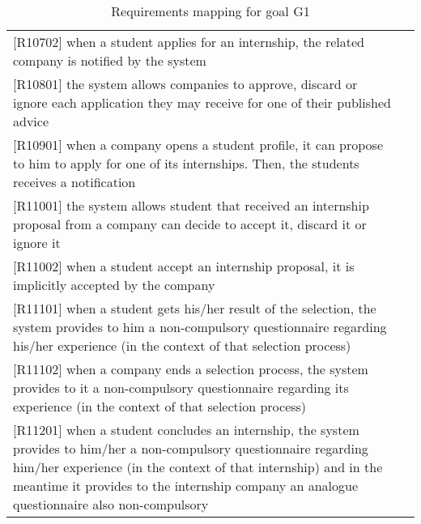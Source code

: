 \begin{table} [h!]
\begin{tabular}{ || P{7.5cm} P{7.5cm} || }
					[R10702] when a student applies for an internship, the related company is notified by the system & \\
					
					[R10801] the system allows companies to approve, discard or ignore each application they may receive for one of their published advice & \\
					
					[R10901] when a company opens a student profile, it can propose to him to apply for one of its internships. Then, the students receives a notification & \\
					
					[R11001] the system allows student that received an internship proposal from a company can decide to accept it, discard it or ignore it & \\
					
					[R11002] when a student accept an internship proposal, it is implicitly accepted by the company & \\
					
					[R11101] when a student gets his/her result of the selection, the system provides to him a non-compulsory questionnaire regarding his/her experience (in the context of that selection process)& \\
					
					[R11102] when a company ends a selection process, the system provides to it a non-compulsory questionnaire regarding its experience (in the context of that selection process) & \\
					
					[R11201] when a student concludes an internship, the system provides to him/her a non-compulsory questionnaire regarding him/her experience (in the context of that internship) and in the meantime it provides to the internship company an analogue questionnaire also non-compulsory & \\
					
					\hline
				\end{tabular}
				\caption{Requirements mapping for goal G1}
				\label {table:1}
			\end{table}
